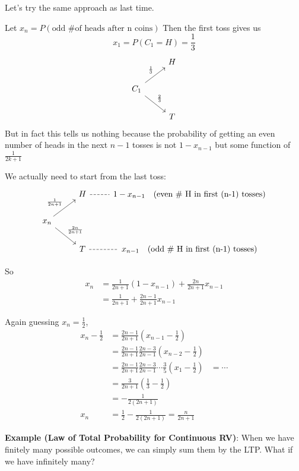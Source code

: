 \documentclass[12pt]{article}
\begin{document}
    Let's try the same approach as last time.

    Let $x_n = P(\text{odd \# of heads after n coins})$ Then the first toss gives us 
    \[x_1 = P(C_1 = H) = \frac{1}{3}\]
    \[\begin{tikzcd}
        & H\\
        C_{1} \arrow[ur, "\frac{1}{3}"] \arrow[dr, "\frac{2}{3}"] &\\
        & T 
    \end{tikzcd}\]
    But in fact this tells us nothing because the probability of getting an even number of heads in the next $n-1$ tosses is not $1 - x_{n-1}$ but some function of $\frac{1}{2k+1}$ 

    We actually need to start from the last toss:
    \[\begin{tikzcd}
        & H \arrow[r, dashed, no head] & 1 - x_{n-1} \quad \text{(even \# H in first (n-1) tosses)}\\ 
        x_{n} \arrow[ur, "{\frac{1}{2n+1}}"] \arrow[dr, "{\frac{2n}{2n+1}}"] &\\
        & T \arrow[r, dashed, no head] & x_{n-1} \quad \text{(odd \# H in first (n-1) tosses)}
    \end{tikzcd}\]

    So 
    \begin{align*}
        x_n &= \frac{1}{2n+1}(1 - x_{n-1}) + \frac{2n}{2n+1}x_{n-1}\\
        &= \frac{1}{2n+1} + \frac{2n - 1}{2n+1}x_{n-1}
    \end{align*}

    Again guessing $x_n = \frac{1}{2}$, 
    \begin{align*}
        x_n - \frac{1}{2} &= \frac{2n - 1}{2n + 1}(x_{n-1} - \frac{1}{2})\\ 
        &= \frac{2n - 1}{2n + 1}\frac{2n - 3}{2n - 1}(x_{n-2} - \frac{1}{2})\\
        &= \frac{2n - 1}{2n + 1}\frac{2n - 3}{2n - 1}\cdots \frac{3}{5}(x_{1} - \frac{1}{2})
        &= \cdots\\
        &= \frac{3}{2n+1}(\frac{1}{3}- \frac{1}{2})\\ 
        &= -\frac{1}{2(2n+1)}\\
        x_n &= \frac{1}{2} - \frac{1}{2(2n+1)} = \boxed{\frac{n}{2n + 1}}
    \end{align*}

    \textbf{Example (Law of Total Probability for Continuous RV)}: When we have finitely many possible outcomes, we can simply sum them by the LTP. What if we have infinitely many? 
    
\end{document}
